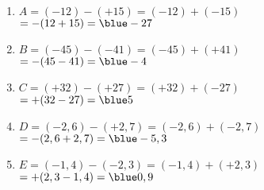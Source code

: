    \ \\ [-5mm]
   \begin{enumerate}
      \item $A =(-12)-(+15)=(-12)+(-15)$ \\
         \qquad\; $=-(12+15) =\blue -27$
      \item $B =(-45)-(-41) =(-45)+(+41)$ \\
         \qquad\; $=-(45-41) =\blue -4$
      \item $C =(+32)-(+27) =(+32)+(-27)$ \\
         \qquad\; $=+(32-27) =\blue 5$
      \item $D =(-2,6)-(+2,7) =(-2,6)+(-2,7)$ \\
         \qquad\; $=-(2,6+2,7) =\blue -5,3$
      \item $E =(-1,4)-(-2,3) =(-1,4)+(+2,3)$ \\
         \qquad\; $=+(2,3-1,4) =\blue 0,9$
   \end{enumerate}
